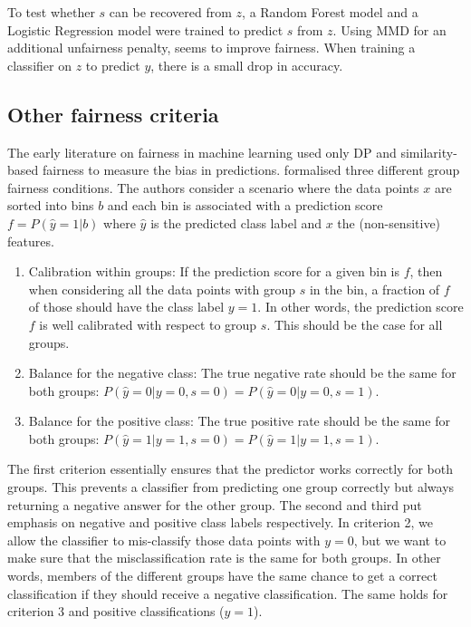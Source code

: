To test whether \(s\) can be recovered from \(z\),
a Random Forest model and a Logistic Regression model were trained to predict \(s\) from \(z\).
Using \ac{MMD} for an additional unfairness penalty, seems to improve fairness.
When training a classifier on \(z\) to predict \(y\), there is a small drop in accuracy.

\subsection{Other fairness criteria}%
\label{improved-definitions-of-fairness}
The early literature on fairness in machine learning used only \ac{DP}
and si\-mi\-la\-ri\-ty-based fairness to measure the bias in predictions.
\citet{kleinberg2016inherent} formalised three different group fairness conditions.
The authors consider a scenario where the data points \(x\) are sorted into bins \(b\)
and each bin is associated with a prediction score \(f = P(\hat{y}=1|b)\)
where \(\hat{y}\) is the predicted class label and \(x\) the (non-sensitive) features.
\begin{enumerate}
\item
  Calibration within groups:
  If the prediction score for a given bin is \(f\),
  then when considering all the data points with group \(s\) in the bin,
  a fraction of \(f\) of those should have the class label \(y=1\).
  In other words, the prediction score \(f\) is well calibrated with respect to group \(s\).
  This should be the case for all groups.
\item
  Balance for the negative class:
  The true negative rate should be the same for both groups: \(P(\hat{y}=0|y=0,s=0) = P(\hat{y}=0|y=0,s=1)\).
\item
  Balance for the positive class:
  The true positive rate should be the same for both groups: \(P(\hat{y}=1|y=1,s=0) = P(\hat{y}=1|y=1,s=1)\).
\end{enumerate}
The first criterion essentially ensures that the predictor works correctly for both groups.
This prevents a classifier from predicting one group correctly
but always returning a negative answer for the other group.
The second and third put emphasis on negative and positive class labels respectively.
In criterion 2, we allow the classifier to mis-classify those data points with \(y=0\),
but we want to make sure that the misclassification rate is the same for both groups.
In other words, members of the different groups have the same chance
to get a correct classification if they should receive a negative classification.
The same holds for criterion 3 and positive classifications (\(y=1\)).

